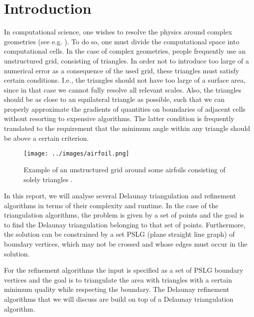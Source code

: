 \section{Introduction}
\label{sec:introduction}
In computational science, one wishes to resolve the physics around complex geometries (see e.g. ).
To do so, one must divide the computational space into computational cells.
In the case of complex geometries, people frequently use an unstructured grid, consisting of triangles.
In order not to introduce too large of a numerical error as a consequence of the used grid, these triangles
must satisfy certain conditions.
I.e., the triangles should not have too large of a surface area,
since in that case we cannot fully resolve all relevant scales.
Also, the triangles should be as close to an equilateral triangle as possible, such that we can
properly approximate the gradients of quantities on boundaries of adjacent cells without resorting to expensive algorithms.
The latter condition is frequently translated to the requirement that the minimum angle
within any triangle should be above a certain criterion.


\begin{figure}
    \centering
    \texttt{[image: ../images/airfoil.png]}
    \caption{Example of an unstructured grid around some airfoils consisting of solely triangles \cite{img:airfoilImage}.}
    \label{fig:introAirfoil}
\end{figure}

In this report, we will analyse several Delaunay triangulation and refinement algorithms
in terms of their complexity and runtime.
In the case of the triangulation algorithms, the problem is given by a set of points and the goal is to find the Delaunay triangulation belonging to that set of points.
Furthermore, the solution can be constrained by a set PSLG (plane straight line graph) of
boundary vertices, which may not be crossed and whose edges must occur in the solution.

For the refinement algorithms the input is specified as a set of PSLG boundary vertices and
the goal is to triangulate the area with triangles with a certain minimum quality while respecting the boundary.
The Delaunay refinement algorithms that we will discuss are build on top of a Delaunay triangulation algorithm.

